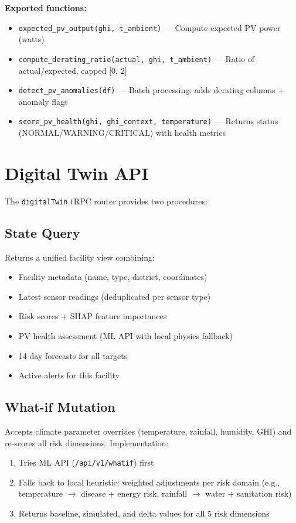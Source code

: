 \documentclass[12pt,a4paper]{report}
\begin{document}
\textbf{Exported functions:}
\begin{itemize}[nosep]
  \item \texttt{expected\_pv\_output(ghi, t\_ambient)} --- Compute expected PV power (watts)
  \item \texttt{compute\_derating\_ratio(actual, ghi, t\_ambient)} --- Ratio of actual/expected, capped [0, 2]
  \item \texttt{detect\_pv\_anomalies(df)} --- Batch processing: adds derating columns + anomaly flags
  \item \texttt{score\_pv\_health(ghi, ghi\_context, temperature)} --- Returns status (NORMAL/WARNING/CRITICAL) with health metrics
\end{itemize}

\section{Digital Twin API}

The \texttt{digitalTwin} tRPC router provides two procedures:

\subsection{State Query}

Returns a unified facility view combining:
\begin{itemize}[nosep]
  \item Facility metadata (name, type, district, coordinates)
  \item Latest sensor readings (deduplicated per sensor type)
  \item Risk scores + SHAP feature importances
  \item PV health assessment (ML API with local physics fallback)
  \item 14-day forecasts for all targets
  \item Active alerts for this facility
\end{itemize}

\subsection{What-if Mutation}

Accepts climate parameter overrides (temperature, rainfall, humidity, GHI) and re-scores all risk dimensions. Implementation:
\begin{enumerate}
  \item Tries ML API (\texttt{/api/v1/whatif}) first
  \item Falls back to local heuristic: weighted adjustments per risk domain (e.g., temperature $\rightarrow$ disease + energy risk, rainfall $\rightarrow$ water + sanitation risk)
  \item Returns baseline, simulated, and delta values for all 5 risk dimensions
\end{enumerate}
\end{document}
